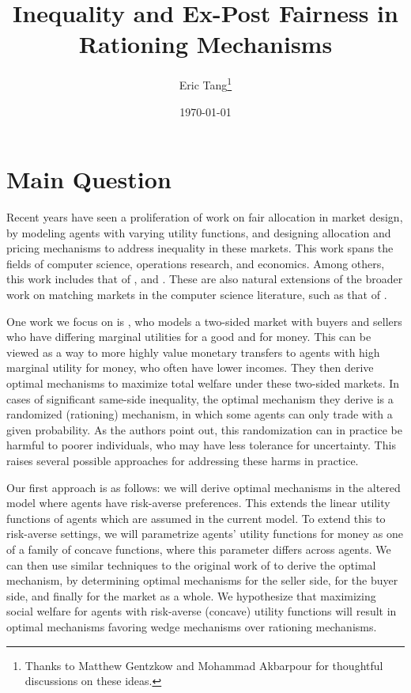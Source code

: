 \documentclass[JEL]{AEA}
\begin{document}
\title{Inequality and Ex-Post Fairness in Rationing Mechanisms}
\author{Eric Tang\thanks{%
Thanks to Matthew Gentzkow and Mohammad Akbarpour for thoughtful discussions on these ideas.}}
\date{\today}
\JEL{}
\Keywords{}

\begin{abstract}
    
\end{abstract}

\maketitle

\section{Main Question}

Recent years have seen a proliferation of work on fair allocation in market design, by modeling agents with varying utility functions, and designing allocation and pricing mechanisms to address inequality in these markets. This work spans the fields of computer science, operations research, and economics. Among others, this work includes that of \cite{babaioff-2019}, \cite{akbarpour-2020} and \cite{budish-2011}. These are also natural extensions of the broader work on matching markets in the computer science literature, such as that of \cite{alaei-2017}.

One work we focus on is \cite{dworczak-2020}, who models a two-sided market with buyers and sellers who have differing marginal utilities for a good and for money. This can be viewed as a way to more highly value monetary transfers to agents with high marginal utility for money, who often have lower incomes. They then derive optimal mechanisms to maximize total welfare under these two-sided markets. In cases of significant same-side inequality, the optimal mechanism they derive is a randomized (rationing) mechanism, in which some agents can only trade with a given probability. As the authors point out, this randomization can in practice be harmful to poorer individuals, who may have less tolerance for uncertainty. This raises several possible approaches for addressing these harms in practice.

Our first approach is as follows: we will derive optimal mechanisms in the altered model where agents have risk-averse preferences. This extends the linear utility functions of agents which are assumed in the current model. To extend this to risk-averse settings, we will parametrize agents' utility functions for money as one of a family of concave functions, where this parameter differs across agents. We can then use similar techniques to the original work of \cite{dworczak-2020} to derive the optimal mechanism, by determining optimal mechanisms for the seller side, for the buyer side, and finally for the market as a whole. We hypothesize that maximizing social welfare for agents with risk-averse (concave) utility functions will result in optimal mechanisms favoring wedge mechanisms over rationing mechanisms.
\end{document}
